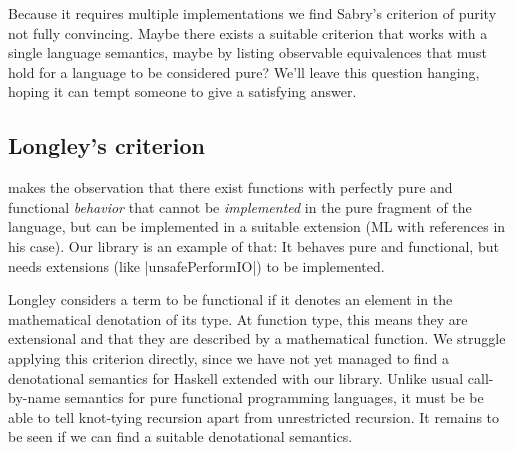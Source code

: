 \documentclass[manuscript,review,screen,acmsmall]{acmart}
\begin{document}
Because it requires multiple implementations we find Sabry’s criterion of purity not fully convincing. Maybe there exists a suitable criterion that works with a single language semantics, maybe by listing observable equivalences that must hold for a language to be considered pure?
We'll leave this question hanging, hoping it can tempt someone to give a satisfying answer.

\subsection{Longley’s criterion}

 makes the observation that there exist functions with perfectly pure and functional \emph{behavior} that cannot be \emph{implemented} in the pure fragment of the language, but can be implemented in a suitable extension (ML with references in his case). Our library is an example of that: It behaves pure and functional, but needs extensions (like |unsafePerformIO|) to be implemented.

Longley considers a term to be functional if it denotes an element in the mathematical denotation of its type. At function type, this means they are extensional and that they are described by a mathematical function. We struggle applying this criterion directly, since we have not yet managed to find a denotational semantics for Haskell extended with our library. Unlike usual call-by-name semantics for pure functional programming languages, it must be be able to tell knot-tying recursion apart from unrestricted recursion. It remains to be seen if we can find a suitable denotational semantics.

\fi
\end{document}
